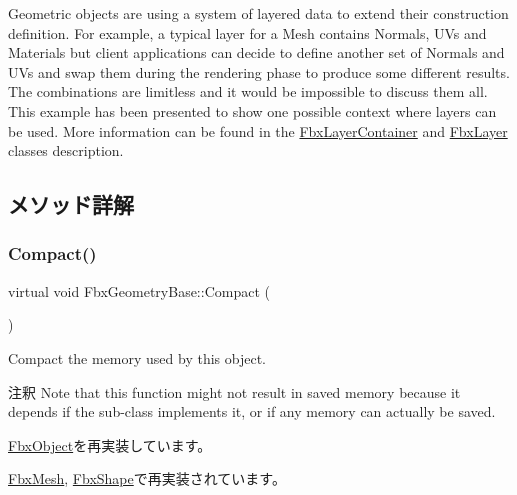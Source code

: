 Geometric objects are using a system of layered data to extend their construction definition. For example, a typical layer for a Mesh contains Normals, U\+Vs and Materials but client applications can decide to define another set of Normals and U\+Vs and swap them during the rendering phase to produce some different results. The combinations are limitless and it would be impossible to discuss them all. This example has been presented to show one possible context where layers can be used. More information can be found in the \hyperlink{class_fbx_layer_container}{Fbx\+Layer\+Container} and \hyperlink{class_fbx_layer}{Fbx\+Layer} classes description. 

\subsection{メソッド詳解}
\mbox{\label{class_fbx_geometry_base_a66146155ecad4e6f6f2e8cf52e0340f6}} 
\subsubsection{\texorpdfstring{Compact()}{Compact()}}
{\footnotesize\ttfamily virtual void Fbx\+Geometry\+Base\+::\+Compact (\begin{DoxyParamCaption}{ }\end{DoxyParamCaption})\hspace{0.3cm}{\ttfamily [virtual]}}

Compact the memory used by this object. \begin{DoxyRemark}{注釈}
Note that this function might not result in saved memory because it depends if the sub-\/class implements it, or if any memory can actually be saved. 
\end{DoxyRemark}


\hyperlink{class_fbx_object_a2720f16a08150d162242b0c59f58c3dc}{Fbx\+Object}を再実装しています。



\hyperlink{class_fbx_mesh_a05ca6a8fbd028777c91931ce6edf4b19}{Fbx\+Mesh}, \hyperlink{class_fbx_shape_a9c3c948d3646bf78472164860ad11d65}{Fbx\+Shape}で再実装されています。

\mbox{\label{class_fbx_geometry_base_a6c27b53ff81cdcbe4f6da4b1acfd4375}} 
